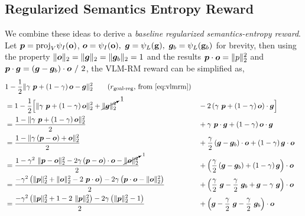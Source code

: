 \newpage
\subsection{Regularized Semantics Entropy Reward}
\label{sec:entropy-reward-reg}
We combine these ideas to derive a \emph{baseline regularized semantics-entropy reward}.
Let \(\bm{p} = \text{proj}_{V}\psi_I(\mathbf{o})\), \(\bm{o} = \psi_I(\mathbf{o}),\ \bm{g} = \psi_L(\mathbf{g}),\ \bm{g}_b = \psi_L(\mathbf{g}_b)\) for brevity, then using the property \(\lVert\bm{o}\rVert_2 = \lVert\bm{g}\rVert_2 = \lVert\bm{g}_b\rVert_2 = 1\) and the results \(\bm{p} \cdot \bm{o} = \lVert p\rVert^2_2\) and \(\bm{p} \cdot \bm{g} = (\bm{g} - \bm{g}_b) \cdot \bm{o}\ /\ 2\), the VLM-RM reward can be simplified as,
\vspace{-1.5pt}
\begin{align}
    &1 - \dfrac{1}{2} \norm{\gamma\ \bmp + \left(1 - \gamma\right) \bmo - \bmg}^2_2 \tag{\(r_{\text{goal-reg}}\), from \ref{eq:vlmrm}}\\
    \label{eq:vlmrm-equivalence-start}
    &= 1 - \dfrac{1}{2} \Big[\norm{\gamma\ \bmp + \left(1 - \gamma\right) \bmo}^2_2 + \cancelto{1}{\norm{\bmg}^2_2} &&- 2 \left(\gamma\ \bmp + \left(1 - \gamma\right) \bmo\right) \cdot \bmg\Big]\\
    &= \dfrac{1 - \norm{\gamma\ \bmp + \left(1 - \gamma\right) \bmo}^2_2}{2} &&+ \gamma\ \bmp \cdot \bmg + \left(1 - \gamma\right) \bmo \cdot \bmg\\
    &= \dfrac{1 - \norm{\gamma \left(\bmp - \bmo\right) + \bmo}^2_2}{2} &&+ \dfrac{\gamma}{2} \left(\bmg - \bmg_b\right) \cdot \bmo + \left(1 - \gamma\right) \bmg \cdot \bmo\\
    &= \dfrac{1 - \gamma^2\ \norm{\bmp - \bmo}^2_2 - 2 \gamma \left(\bmp - \bmo\right) \cdot \bmo - \cancelto{1}{\norm{\bmo}^2_2}}{2} &&+ \left(\dfrac{\gamma}{2} \left(\bmg - \bmg_b\right) + \left(1 - \gamma\right) \bmg\right) \cdot \bmo\\
    &= \dfrac{-\gamma^2 \left(\norm{\bmp}^2_2 + \norm{\bmo}^2_2 - 2\ \bmp \cdot \bmo\right) - 2 \gamma \left(\bmp \cdot \bmo - \norm{\bmo}^2_2\right)}{2} &&+ \left(\dfrac{\gamma}{2}\ \bmg - \dfrac{\gamma}{2}\ \bmg_b + \bmg - \gamma\ \bmg\right) \cdot \bmo\\
    &= \dfrac{-\gamma^2 \left(\norm{\bmp}^2_2 + 1 - 2\ \norm{\bmp}^2_2\right) - 2 \gamma \left(\norm{\bmp}^2_2 - 1\right)}{2} &&+ \left(\bmg - \dfrac{\gamma}{2}\ \bmg - \dfrac{\gamma}{2}\ \bmg_b\right) \cdot \bmo\\

\end{align}
